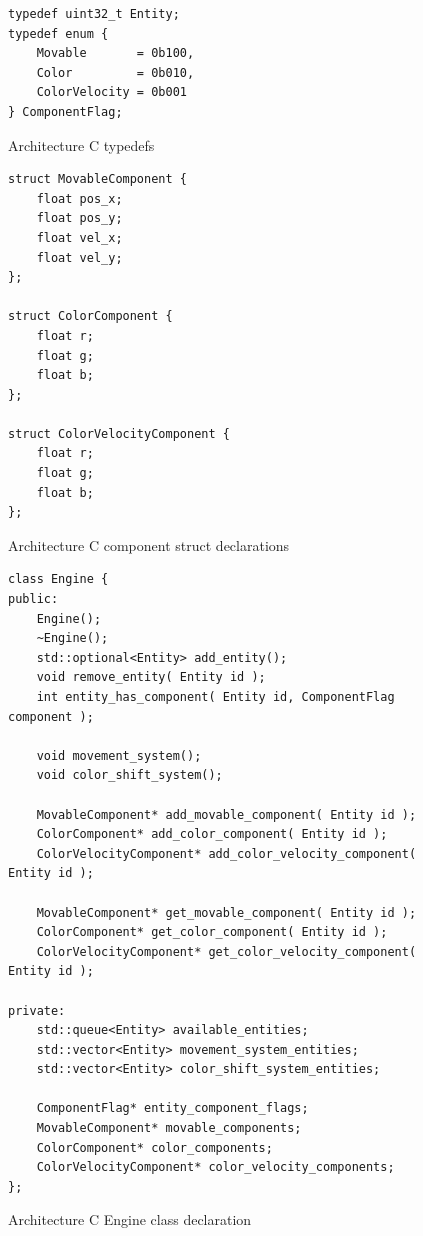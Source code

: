 \documentclass{article}
\begin{document}
\begin{figure}
\centering
\begin{BVerbatim}
typedef uint32_t Entity;
typedef enum {
    Movable       = 0b100,
    Color         = 0b010,
    ColorVelocity = 0b001
} ComponentFlag;
\end{BVerbatim}
\caption{Architecture C typedefs}
\label{arch_c_typedefs}
\end{figure}

\begin{figure}
\centering
\begin{BVerbatim}
struct MovableComponent {
    float pos_x;
    float pos_y;
    float vel_x;
    float vel_y;
};

struct ColorComponent {
    float r;
    float g;
    float b;
};

struct ColorVelocityComponent {
    float r;
    float g;
    float b;
};
\end{BVerbatim}
\caption{Architecture C component struct declarations}
\label{arch_c_components_header}
\end{figure}

\begin{figure}
\centering
\begin{BVerbatim}
class Engine {
public:
    Engine();
    ~Engine();
    std::optional<Entity> add_entity();
    void remove_entity( Entity id );
    int entity_has_component( Entity id, ComponentFlag component );

    void movement_system();
    void color_shift_system();

    MovableComponent* add_movable_component( Entity id );
    ColorComponent* add_color_component( Entity id );
    ColorVelocityComponent* add_color_velocity_component( Entity id );

    MovableComponent* get_movable_component( Entity id );
    ColorComponent* get_color_component( Entity id );
    ColorVelocityComponent* get_color_velocity_component( Entity id );

private:
    std::queue<Entity> available_entities;
    std::vector<Entity> movement_system_entities;
    std::vector<Entity> color_shift_system_entities;

    ComponentFlag* entity_component_flags;
    MovableComponent* movable_components;
    ColorComponent* color_components;
    ColorVelocityComponent* color_velocity_components;
};
\end{BVerbatim}
\caption{Architecture C Engine class declaration}
\label{arch_c_engine_header}
\end{figure}
\end{document}

